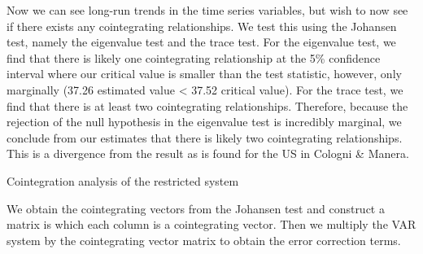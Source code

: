 \documentclass[11pt,preprint, authoryear]{elsarticle}
\numberwithin{equation}{section}
\numberwithin{figure}{section}
\numberwithin{table}{section}
\begin{document}
Now we can see long-run trends in the time series variables, but wish to
now see if there exists any cointegrating relationships. We test this
using the Johansen test, namely the eigenvalue test and the trace test.
For the eigenvalue test, we find that there is likely one cointegrating
relationship at the 5\% confidence interval where our critical value is
smaller than the test statistic, however, only marginally (37.26
estimated value \textless{} 37.52 critical value). For the trace test,
we find that there is at least two cointegrating relationships.
Therefore, because the rejection of the null hypothesis in the
eigenvalue test is incredibly marginal, we conclude from our estimates
that there is likely two cointegrating relationships. This is a
divergence from the result as is found for the US in Cologni \& Manera.

Cointegration analysis of the restricted system

We obtain the cointegrating vectors from the Johansen test and construct
a matrix is which each column is a cointegrating vector. Then we
multiply the VAR system by the cointegrating vector matrix to obtain the
error correction terms.
\end{document}
